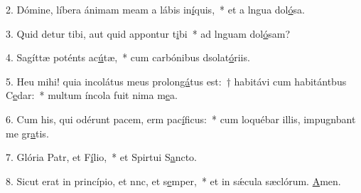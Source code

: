 2. Dómine, líbera ánimam meam a lábis in\uline{í}quis,~* et a lngua dol\uline{ó}sa.\par 
3. Quid detur tibi, aut quid appontur t\uline{i}bi~* ad lnguam dol\uline{ó}sam?\par 
4. Sagíttæ poténts ac\uline{ú}tæ,~* cum carbónibus dsolat\uline{ó}riis.\par 
5. Heu mihi! quia incolátus meus prolon\uline{gá}tus est:~† habitávi cum habitántbus C\uline{e}dar:~* multum íncola fuit nima m\uline{e}a.\par 
6. Cum his, qui odérunt pacem, erm pac\uline{í}ficus:~* cum loquébar illis, impugnbant me gr\uline{a}tis.\par 
7. Glória Patr, et F\uline{í}lio,~* et Spirtui S\uline{a}ncto.\par 
8. Sicut erat in princípio, et nnc, et s\uline{e}mper,~* et in sǽcula sæclórum. \uline{A}men.\par 
